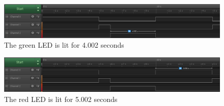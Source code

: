 \begin{figure}[H]
    \centering

    \includegraphics[scale=0.43]{img/green.png}

    \caption{The green LED is lit for 4.002 seconds}
    \label{fig:green}

\end{figure}

\begin{figure}[H]
    \centering

    \includegraphics[scale=0.43]{img/red.png}

    \caption{The red LED is lit for 5.002 seconds}
    \label{fig:red}

\end{figure}
